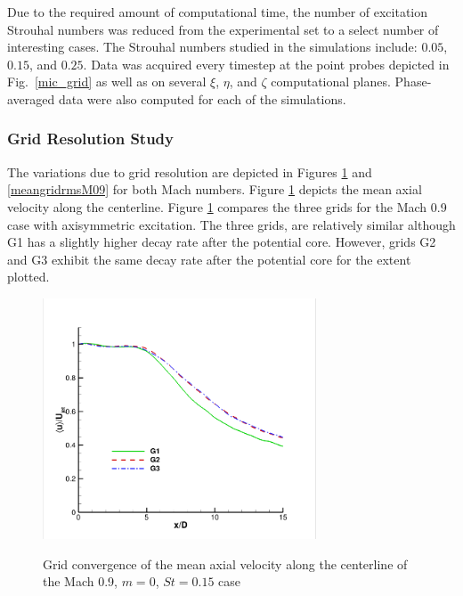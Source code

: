 \documentclass[english]{aiaa-tc}
\begin{document}
Due to the required amount of computational time, the number of excitation Strouhal numbers was reduced from the experimental set to a select number of interesting cases.
The Strouhal numbers studied in the
simulations include: $0.05$, $0.15$, and $0.25$. Data was acquired
every timestep at the point probes depicted in Fig.~\ref{mic_grid}
as well as on several $\xi$, $\eta$, and $\zeta$ computational planes.
Phase-averaged data were also computed for each of the simulations.

\subsubsection{Grid Resolution Study}
 The variations due to grid resolution are depicted in Figures \ref{meangridM09} and \ref{meangridrmsM09} for both Mach numbers. Figure \ref{meangridM09} depicts the mean axial velocity along the centerline. Figure \ref{meangridM09} compares the three grids for the Mach 0.9 case with axisymmetric excitation. The three grids, are relatively similar although G1 has a slightly higher decay rate after the potential core. However, grids G2 and G3 exhibit the same decay rate after the potential core for the extent plotted. 
\begin{figure}
\begin{center}
{\includegraphics[width=3.2in]{gridstudyM09meancenter.png}\label{meangridM09}}
\caption{Grid convergence of the mean axial velocity along the centerline of the Mach 0.9, $m=0$, $St=0.15$ case}
\end{center}
 \end{figure}
\end{document}
